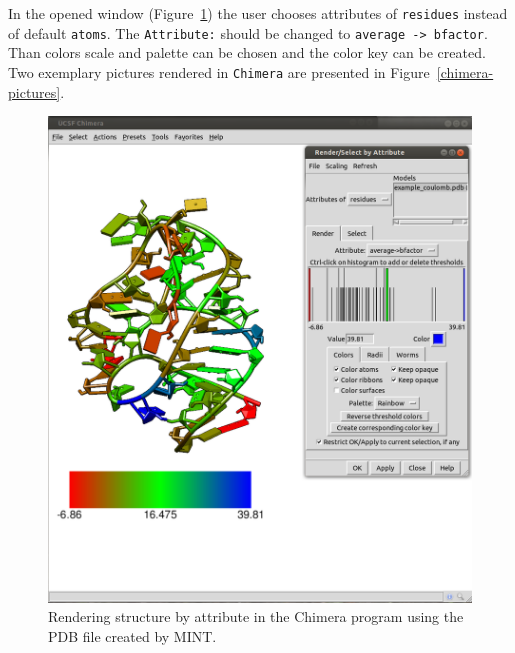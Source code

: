 \documentclass[12pt]{article}
\begin{document}
In the opened window (Figure~\ref{chimera22}) the user chooses attributes of \texttt{residues} instead of default \texttt{atoms}. The \texttt{Attribute:} should be changed to \texttt{average -> bfactor}. Than colors scale and palette can be chosen and the color key can be created. Two exemplary pictures rendered in {\tt Chimera} are presented in Figure~\ref{chimera-pictures}.
\begin{figure}[!h]
\centering
\includegraphics[scale=0.3]{./pictures/chimera2.png}
\caption{Rendering structure by attribute in the Chimera program using the PDB file created by MINT.}
\label{chimera22}
\end{figure}
\end{document}
